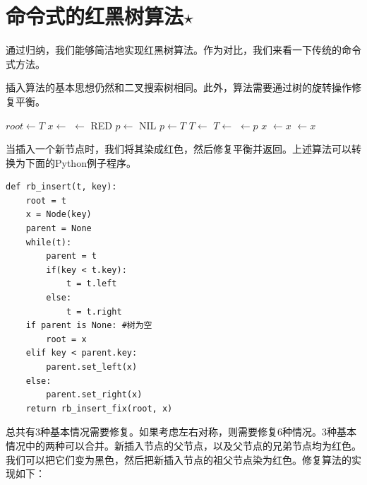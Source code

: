 \documentclass{ctexart}
\begin{document}
\section{命令式的红黑树算法$\star$}

通过归纳，我们能够简洁地实现红黑树算法。作为对比，我们来看一下传统的命令式方法。

插入算法的基本思想仍然和二叉搜索树相同。此外，算法需要通过树的旋转操作修复平衡。

\begin{algorithmic}[1]
  \State $root \gets T$
  \State $x \gets$ 
  \State {} $\gets$ RED
  \State $p \gets$ NIL
    \State $p \gets T$
      \State $T \gets $ 
    \Else
      \State $T \gets $ 
    \EndIf
  \EndWhile
  \State {} $\gets p$
   
    \State \Return $x$
    \State {} $\gets x$
  \Else
    \State {} $\gets x$
  \EndIf
  \State \Return {}
\EndFunction
\end{algorithmic}

当插入一个新节点时，我们将其染成红色，然后修复平衡并返回。上述算法可以转换为下面的Python例子程序。

\lstset{language=Python}
\begin{lstlisting}
def rb_insert(t, key):
    root = t
    x = Node(key)
    parent = None
    while(t):
        parent = t
        if(key < t.key):
            t = t.left
        else:
            t = t.right
    if parent is None: #树为空
        root = x
    elif key < parent.key:
        parent.set_left(x)
    else:
        parent.set_right(x)
    return rb_insert_fix(root, x)
\end{lstlisting}

总共有3种基本情况需要修复。如果考虑左右对称，则需要修复6种情况。3种基本情况中的两种可以合并。新插入节点的父节点，以及父节点的兄弟节点均为红色。我们可以把它们变为黑色，然后把新插入节点的祖父节点染为红色。修复算法的实现如下：
\end{document}
